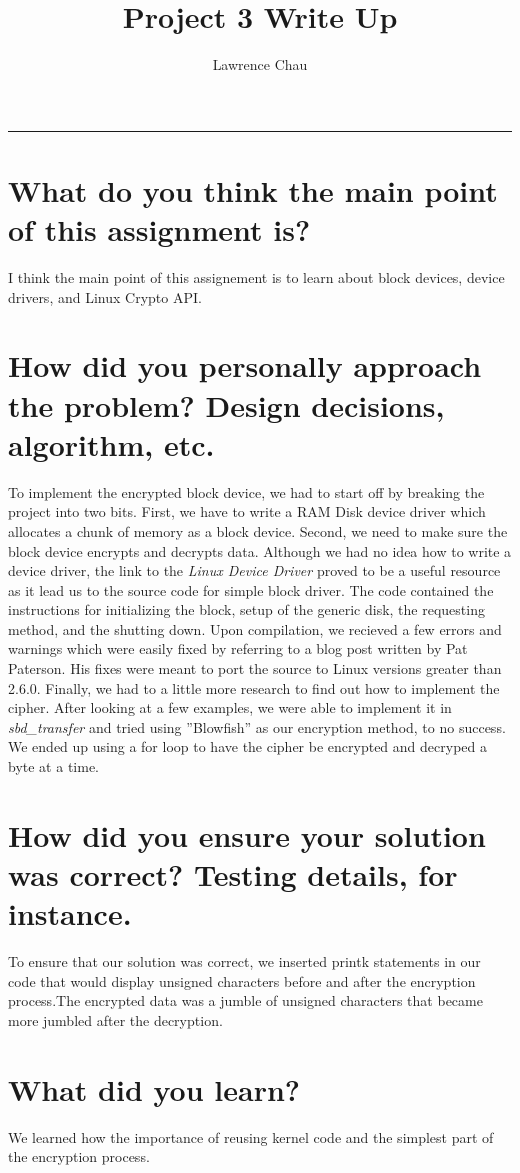 \documentclass[letterpaper,10pt,notitlepage,fleqn]{article}
\title{Project 3 Write Up}
\author{Lawrence Chau}
\begin{document}
\maketitle
\hrule

\section*{What do you think the main point of this assignment is?}
    I think the main point of this assignement is to learn about block devices, device drivers, and Linux Crypto API.

\section*{How did you personally approach the problem? Design decisions, algorithm, etc.}
    To implement the encrypted block device, we had to start off by breaking the project into two bits. First, we have to write a RAM Disk device driver which allocates a chunk of memory as a block device. Second, we need to make sure the block device encrypts and decrypts data. Although we had no idea how to write a device driver, the link to the \textit{Linux Device Driver} proved to be a useful resource as it lead us to the source code for simple block driver. The code contained the
    instructions for initializing the block, setup of the generic disk, the requesting method, and the shutting down. Upon compilation, we recieved a few errors and warnings which were easily fixed by referring to a blog post written by Pat Paterson. His fixes were meant to port the source to Linux versions greater than 2.6.0. Finally, we had to a little more research to find out how to implement the cipher. After looking at a few examples, we were able to implement it in
    \textit{sbd\_transfer} and tried using ''Blowfish'' as our encryption method, to no success. We ended up using a for loop to have the cipher be encrypted and decryped a byte at a time. 
    
\section*{How did you ensure your solution was correct? Testing details, for instance.}
    To ensure that our solution was correct, we inserted printk statements in our code that would display unsigned characters before and after the encryption process.The encrypted data was a jumble of unsigned characters that became more jumbled after the decryption.

\section*{What did you learn?}
    We learned how the importance of reusing kernel code and the simplest part of the encryption process.
\end{document}
